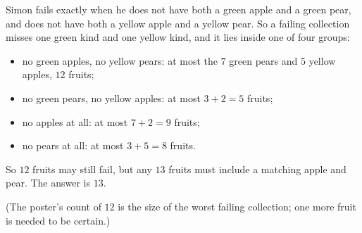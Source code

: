Simon fails exactly when he does not have both a green apple and a green pear, and does not have both a yellow apple and a yellow pear. So a failing collection misses one green kind and one yellow kind, and it lies inside one of four groups:
\begin{itemize}
\item no green apples, no yellow pears: at most the $7$ green pears and $5$ yellow apples, $12$ fruits;
\item no green pears, no yellow apples: at most $3+2=5$ fruits;
\item no apples at all: at most $7+2=9$ fruits;
\item no pears at all: at most $3+5=8$ fruits.
\end{itemize} So $12$ fruits may still fail, but any $13$ fruits must include a matching apple and pear. The answer is $\boxed{13}$.

(The poster's count of $12$ is the size of the worst failing collection; one more fruit is needed to be certain.)
